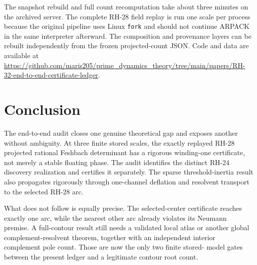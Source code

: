 \documentclass[11pt]{article}
\theoremstyle{definition}
\theoremstyle{remark}
\begin{document}
The snapshot rebuild and full count recomputation take about three minutes
on the archived server.  The complete RH-28 field replay is run one scale
per process because the original pipeline uses Linux \texttt{fork} and
should not continue ARPACK in the same interpreter afterward.  The
composition and provenance layers can be rebuilt independently from the
frozen projected-count JSON.  Code and data are available at
\url{https://github.com/maris205/prime_dynamics_theory/tree/main/papers/RH-32-end-to-end-certificate-ledger}.


\section{Conclusion}
\label{sec:conclusion}

The end-to-end audit closes one genuine theoretical gap and exposes another
without ambiguity.  At three finite stored scales, the exactly replayed
RH-28 projected rational Feshbach determinant has a rigorous winding-one
certificate, not merely a stable floating phase.  The audit identifies the
distinct RH-24 discovery realization and certifies it separately.  The
sparse threshold-inertia result also propagates rigorously through
one-channel deflation and resolvent transport to the selected RH-28 arc.

What does not follow is equally precise.  The selected-center certificate
reaches exactly one arc, while the nearest other arc already violates its
Neumann premise.  A full-contour result still needs a validated local atlas
or another global complement-resolvent theorem, together with an independent
interior complement pole count.  Those are now the only two finite stored-
model gates between the present ledger and a legitimate contour root count.



\end{document}
